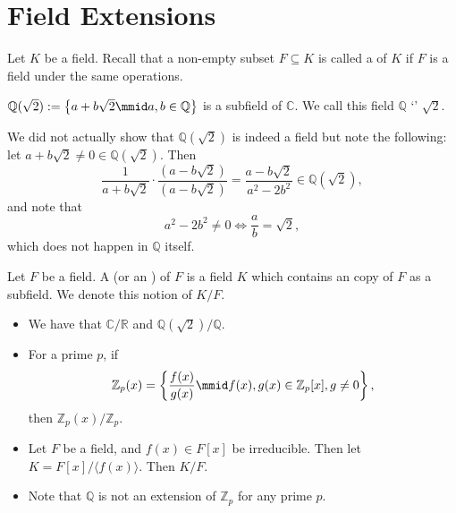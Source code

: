 \documentclass[notoc,notitlepage,nobib]{tufte-book}
\begin{document}


\section{Field Extensions}%
\label{sec:field_extensions}

Let $K$ be a field. Recall that a non-empty subset $F \subseteq K$ is called a  of $K$
if $F$ is a field under the same operations.

\begin{eg}
  $\mathbb{Q}(\sqrt{2}) := \left\{ a + b\sqrt{2} \mmid a, b \in \mathbb{Q} \right\}$ is a subfield of
  $\mathbb{C}$. We call this field $\mathbb{Q}$ `' $\sqrt{2}$.
\end{eg}

\begin{note}
  We did not actually show that $\mathbb{Q}(\sqrt{2})$ is indeed a field but note the following:
  let $a + b \sqrt{2} \neq 0 \in \mathbb{Q}(\sqrt{2})$. Then
  \begin{equation*}
    \frac{1}{a + b\sqrt{2}} \cdot \frac{(a - b\sqrt{2})}{(a - b \sqrt{2})} = \frac{a - b \sqrt{2}}{a^2 - 2b^2} \in \mathbb{Q}(\sqrt{2}),
  \end{equation*}
  and note that
  \begin{equation*}
    a^2 - 2b^2 \neq 0 \iff \frac{a}{b} = \sqrt{2},
  \end{equation*}
  which does not happen in $\mathbb{Q}$ itself.
\end{note}

\begin{defn}\label{defn:field_extension}
  Let $F$ be a field. A  (or an ) of $F$ is a field $K$
  which contains an  copy of $F$ as a subfield. We denote this notion of $K/F$.
\end{defn}

\begin{eg}
  \begin{itemize}
    \item We have that $\mathbb{C} / \mathbb{R}$ and $\mathbb{Q}(\sqrt{2}) / \mathbb{Q}$.

    \item For a prime $p$, if
      \begin{equation*}
        \mathbb{Z}_p(x) = \left\{ \frac{f(x)}{g(x)} \mmid f(x), g(x) \in
          \mathbb{Z}_p[x], g \neq 0 \right\},
      \end{equation*}
      then $\mathbb{Z}_p(x) / \mathbb{Z}_p$.

    \item Let $F$ be a field, and $f(x) \in F[x]$ be irreducible. Then let $K =
      F[x]/\langle f(x) \rangle$. Then $K / F$.

    \item Note that $\mathbb{Q}$ is not an extension of $\mathbb{Z}_p$ for any
      prime $p$.
  \end{itemize}
\end{eg}
\end{document}
